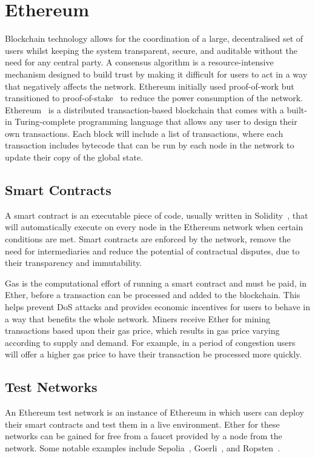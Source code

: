 
\section{Ethereum}

Blockchain technology allows for the coordination of a large, decentralised set of users whilst keeping the system transparent, secure, and auditable without the need for any central party. A consensus algorithm is a resource-intensive mechanism designed to build trust by making it difficult for users to act in a way that negatively affects the network. Ethereum initially used proof-of-work but transitioned to proof-of-stake~\cite{kapengut_event_2023} to reduce the power consumption of the network.
\x
Ethereum~\cite{vujicic_blockchain_2018,dannen_introducing_2017} is a distributed transaction-based blockchain that comes with a built-in Turing-complete programming language that allows any user to design their own transactions. Each block will include a list of transactions, where each transaction includes bytecode that can be run by each node in the network to update their copy of the global state.

\subsection*{Smart Contracts}

A smart contract is an executable piece of code, usually written in Solidity~\cite{noauthor_solidity_nodate}, that will automatically execute on every node in the Ethereum network when certain conditions are met. Smart contracts are enforced by the network, remove the need for intermediaries and reduce the potential of contractual disputes, due to their transparency and immutability.

\vspace{2mm}
\noindent
Gas is the computational effort of running a smart contract and must be paid, in Ether, before a transaction can be processed and added to the blockchain. This helps prevent DoS attacks and provides economic incentives for users to behave in a way that benefits the whole network.
\x
Miners receive Ether for mining transactions based upon their gas price, which results in gas price varying according to supply and demand. For example, in a period of congestion users will offer a higher gas price to have their transaction be processed more quickly.

\subsection*{Test Networks}

An Ethereum test network is an instance of Ethereum in which users can deploy their smart contracts and test them in a live environment. Ether for these networks can be gained for free from a faucet provided by a node from the network. Some notable examples include Sepolia~\cite{noauthor_sepolia_nodate}, Goerli~\cite{noauthor_goerli_nodate}, and Ropsten~\cite{noauthor_ropsten_2023}.